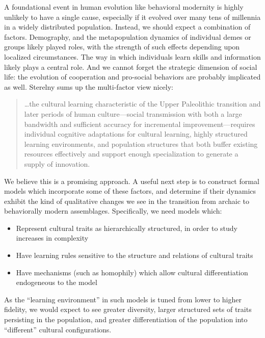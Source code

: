 \documentclass[graybox,natbib]{svmult}
\begin{document}
A foundational event in human evolution like behavioral modernity is
highly unlikely to have a single cause, especially if it evolved over
many tens of millennia in a widely distributed population. Instead, we
should expect a combination of factors. Demography, and the
metapopulation dynamics of individual demes or groups likely played
roles, with the strength of such effects depending upon localized
circumstances. The way in which individuals learn skills and information
likely plays a central role. And we cannot forget the strategic
dimension of social life: the evolution of cooperation and pro-social
behaviors are probably implicated as well. Sterelny
\citeyearpar[p.61]{sterelny2012evolved} sums up the multi-factor view
nicely:

\begin{quote}
\ldots{}the cultural learning characteristic of the Upper Paleolithic
transition and later periods of human culture---social transmission with
both a large bandwidth and sufficient accuracy for incremental
improvement---requires individual cognitive adaptations for cultural
learning, highly structured learning environments, and population
structures that both buffer existing resources effectively and support
enough specialization to generate a supply of innovation.
\end{quote}

We believe this is a promising approach. A useful next step is to
construct formal models which incorporate some of these factors, and
determine if their dynamics exhibit the kind of qualitative changes we
see in the transition from archaic to behaviorally modern assemblages.
Specifically, we need models which:

\begin{itemize}
\itemsep1pt\parskip0pt
\item
  Represent cultural traits as hierarchically structured, in order to
  study increases in complexity
\item
  Have learning rules sensitive to the structure and relations of
  cultural traits
\item
  Have mechanisms (such as homophily) which allow cultural
  differentiation endogeneous to the model
\end{itemize}

As the ``learning environment'' in such models is tuned from lower to
higher fidelity, we would expect to see greater diversity, larger
structured sets of traits persisting in the population, and greater
differentiation of the population into ``different'' cultural
configurations.
\end{document}
